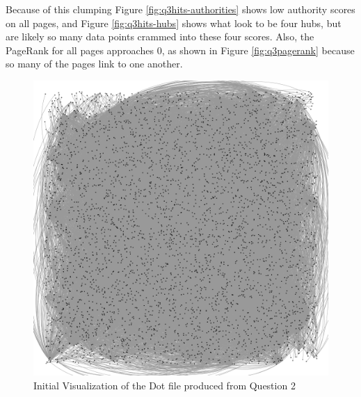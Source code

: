 \documentclass[letterpaper,11pt]{article}
\begin{document}
Because of this clumping Figure \ref{fig:q3hits-authorities} shows low authority scores on all pages, and Figure \ref{fig:q3hits-hubs} shows what look to be four hubs, but are likely so many data points crammed into these four scores.  Also, the PageRank for all pages approaches $0$, as shown in Figure \ref{fig:q3pagerank} because so many of the pages link to one another.

\begin{figure}[p]
\includegraphics[scale=0.3]{q3/Visualized/visualized.png}
\caption{Initial Visualization of the Dot file produced from Question 2}
\label{fig:q3vis-hairball}
\end{figure}
\end{document}
